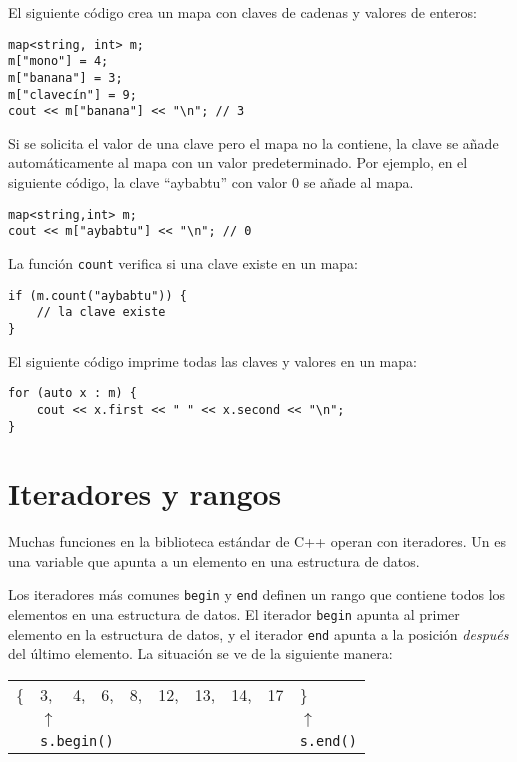 El siguiente código crea un mapa
con claves de cadenas y valores de enteros:

\begin{lstlisting}
map<string, int> m;
m["mono"] = 4;
m["banana"] = 3;
m["clavecín"] = 9;
cout << m["banana"] << "\n"; // 3
\end{lstlisting}

Si se solicita el valor de una clave
pero el mapa no la contiene,
la clave se añade automáticamente al mapa con
un valor predeterminado.
Por ejemplo, en el siguiente código,
la clave ``aybabtu'' con valor 0
se añade al mapa.

\begin{lstlisting}
map<string,int> m;
cout << m["aybabtu"] << "\n"; // 0
\end{lstlisting}
La función \texttt{count} verifica
si una clave existe en un mapa:
\begin{lstlisting}
if (m.count("aybabtu")) {
    // la clave existe
}
\end{lstlisting}
El siguiente código imprime todas las claves y valores
en un mapa:
\begin{lstlisting}
for (auto x : m) {
    cout << x.first << " " << x.second << "\n";
}
\end{lstlisting}

\section{Iteradores y rangos}


Muchas funciones en la biblioteca estándar de C++
operan con iteradores.
Un  es una variable que apunta
a un elemento en una estructura de datos.

Los iteradores más comunes \texttt{begin}
y \texttt{end} definen un rango que contiene
todos los elementos en una estructura de datos.
El iterador \texttt{begin} apunta al
primer elemento en la estructura de datos,
y el iterador \texttt{end} apunta a
la posición \emph{después} del último elemento.
La situación se ve de la siguiente manera:

\begin{center}
    \begin{tabular}{llllllllll}
        \{ & 3,                                     & 4, & 6, & 8, & 12, & 13, & 14,              & 17 & \}         \\
           & $\uparrow$                             &    &    &    &     &     &                  &    & $\uparrow$ \\
           & \multicolumn{3}{l}{\texttt{s.begin()}} &    &    &    &     &     & \texttt{s.end()}                   \\
    \end{tabular}
\end{center}

